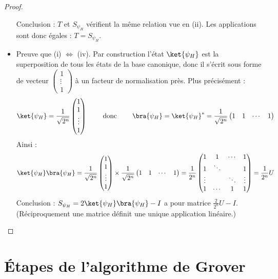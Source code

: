 \documentclass[11pt,class=report,crop=false]{standalone}
\begin{document}
\begin{proof}
\begin{itemize}
Conclusion : $T$ et $S_{\psi_H}$  vérifient la même relation vue en (ii). Les applications sont donc égales :  $T=S_{\psi_H}$.

  \item Preuve que (i) $\iff$ (iv).  Par construction l'état $\ket{\psi_H}$ est la superposition de tous les états de la base canonique, donc il s'écrit sous forme de vecteur $\left(\begin{smallmatrix}1\\\vdots\\1\end{smallmatrix}\right)$ à un facteur de normalisation près. 
Plus précisément :
$$\ket{\psi_H} = \frac{1}{\sqrt{2^n}}\begin{pmatrix}1\\1\\\vdots\\1\end{pmatrix}
\qquad \text{ donc } \qquad \bra{\psi_H} = \ket{\psi_H}^* = \frac{1}{\sqrt{2^n}}\begin{pmatrix}1&1&\cdots&1\end{pmatrix}$$
Ainsi :
$$\ket{\psi_H}\bra{\psi_H}  = \frac{1}{\sqrt{2^n}}\begin{pmatrix}1\\1\\\vdots\\1\end{pmatrix} 
\times  \frac{1}{\sqrt{2^n}}\begin{pmatrix}1&1&\cdots&1\end{pmatrix}
= \frac{1}{2^n} \begin{pmatrix}
1&1&\cdots&1\\
1&\ddots &&1\\
\vdots&&\ddots &\vdots\\
1&\cdots&1&1\\
\end{pmatrix}
= \frac{1}{2^n}  U$$
Conclusion : $S_{\psi_H} = 2 \ket{\psi_H} \bra{\psi_H} - I$ a pour matrice $\frac{2}{2^n} U - I$. (Réciproquement une matrice définit une unique application linéaire.)

\end{itemize}

\end{proof}

\section{\'Etapes de l'algorithme de Grover}
\end{document}
